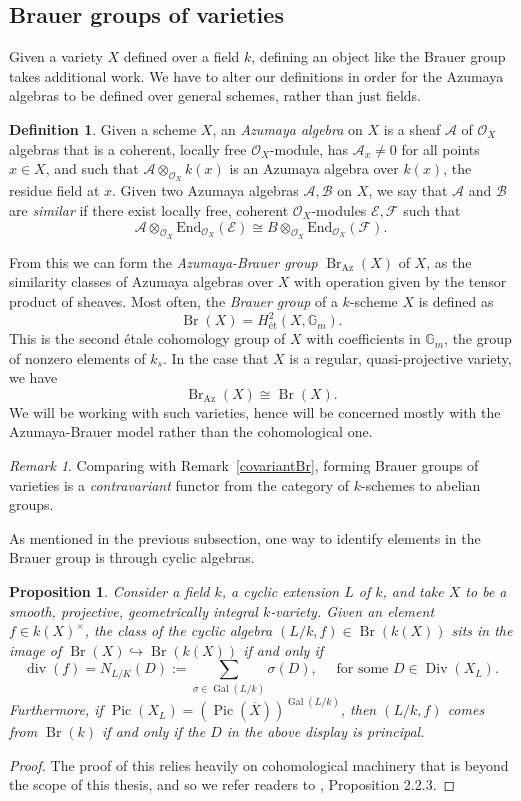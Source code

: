 \documentclass[12pt,twoside]{reedthesis}
\theoremstyle{plain}
\newtheorem{proposition}[theorem]{Proposition}
\theoremstyle{definition}
\newtheorem{definition}{Definition}[section]
\theoremstyle{remark}
\newtheorem{remark}{Remark}[section]
\newcommand{\calA}{\mathcal{A}}
\newcommand{\calO}{\mathcal{O}}
\newcommand{\Div}{\operatorname{Div}}
\newcommand{\Br}{\operatorname{Br}}
\newcommand{\Pic}{\operatorname{Pic}}
\renewcommand{\div}{\operatorname{div}}
\newcommand{\Gal}{\operatorname{Gal}}
\begin{document}
\subsection{Brauer groups of varieties}
Given a variety $X$ defined over a field $k$, defining an object like the Brauer group takes additional work. We have to alter our definitions in order for the Azumaya algebras to be defined over general schemes, rather than just fields.
\begin{definition}
Given a scheme $X$, an \emph{Azumaya algebra} on $X$ is a sheaf $\calA$ of $\calO_X$ algebras that is a coherent, locally free $\calO_X$-module, has $\calA_x\neq0$ for all points $x\in X$, and such that $\calA\otimes_{\calO_X} k(x)$ is an Azumaya algebra over $k(x)$, the residue field at $x$. Given two Azumaya algebras $\mathcal{A},\mathcal{B}$ on $X$, we say that $\mathcal{A}$ and $\mathcal{B}$ are \emph{similar} if there exist locally free, coherent $\calO_X$-modules $\mathcal{E},\mathcal{F}$ such that 
\[
\mathcal{A}\otimes_{\calO_X}\text{End}_{\calO_X}(\mathcal{E})\cong B\otimes_{\calO_X}\text{End}_{\calO_X}(\mathcal{F}).
\]
\end{definition}
\noindent From this we can form the \emph{Azumaya-Brauer group} $\Br_\text{Az}(X)$ of $X$, as the similarity classes of Azumaya algebras over $X$ with operation given by the tensor product of sheaves. Most often, the \emph{Brauer group} of a $k$-scheme $X$ is defined as \[\Br(X)=H^2_\text{\'et}(X,\mathbb{G}_m).\] This is the second \'etale cohomology group of $X$ with coefficients in $\mathbb{G}_m$, the group of nonzero elements of $k_s$. In the case that $X$ is a regular, quasi-projective variety, we have \[\Br_\text{Az}(X)\cong \Br(X).\] We will be working with such varieties, hence will be concerned mostly with the Azumaya-Brauer model rather than the cohomological one.
\begin{remark}
Comparing with Remark~\ref{covariantBr}, forming Brauer groups of varieties is a \emph{contravariant} functor from the category of $k$-schemes to abelian groups.
\end{remark}
As mentioned in the previous subsection, one way to identify elements in the Brauer group is through cyclic algebras.
\begin{proposition}
Consider a field $k$, a cyclic extension $L$ of $k$, and take $X$ to be a smooth, projective, geometrically integral $k$-variety. Given an element $f\in k(X)^\times$, the class of the cyclic algebra $(L/k,f)\in\Br(k(X))$ sits in the image of $\Br(X)\hookrightarrow\Br(k(X))$ if and only if
\[
\div(f)=N_{L/K}(D):=\sum_{\sigma\in\Gal(L/k)}\sigma(D),\quad\text{ for some $D\in\Div(X_L)$.}
\] 
Furthermore, if $\Pic(X_L)=(\Pic(\overline{X}))^{\Gal(L/k)}$, then $(L/k,f)$ comes from $\Br(k)$ if and only if the $D$ in the above display is principal.
\end{proposition}
\begin{proof}
The proof of this relies heavily on cohomological machinery that is beyond the scope of this thesis, and so we refer readers to \cite{corn}, Proposition 2.2.3. 
\end{proof}
\end{document}
